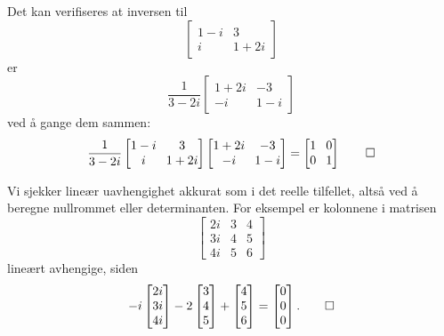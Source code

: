 \begin{ex}
Det kan verifiseres at inversen til 
\[
\begin{bmatrix}
1-i & 3  \\ i &1+2i 
\end{bmatrix}
\]
er
\[
\frac{1}{3-2i}
\begin{bmatrix}
1+2i & -3  \\ -i &1-i 
\end{bmatrix}
\]
ved å gange dem sammen:
\[
\frac{1}{3-2i}
\setlength\arraycolsep{4pt}
\begin{bmatrix}
1-i & 3  \\ i &1+2i 
\end{bmatrix}
\begin{bmatrix}
1+2i & -3  \\ -i &1-i 
\end{bmatrix}
=
\begin{bmatrix}
1 & 0  \\ 0 &1 
\end{bmatrix} \qedhere
\]


\end{ex}

\begin{ex}
Vi sjekker lineær uavhengighet akkurat som i det reelle tilfellet, altså ved å beregne nullrommet eller determinanten. For eksempel er kolonnene i matrisen 
\[
\begin{bmatrix}
2i & 3 & 4 \\ 3i & 4 & 5 \\ 4i &  5 &6  
\end{bmatrix}
\]
lineært avhengige, siden 
\[
-i
\begin{bmatrix}
2i  \\ 3i \\ 4i 
\end{bmatrix}
-2
\begin{bmatrix}
 3 \\  4  \\   5 
\end{bmatrix}
+
\begin{bmatrix}
 4 \\ 5 \\  6  
\end{bmatrix}
=
\begin{bmatrix}
0 \\ 0 \\ 0
\end{bmatrix}. \qedhere
\]
\end{ex}





